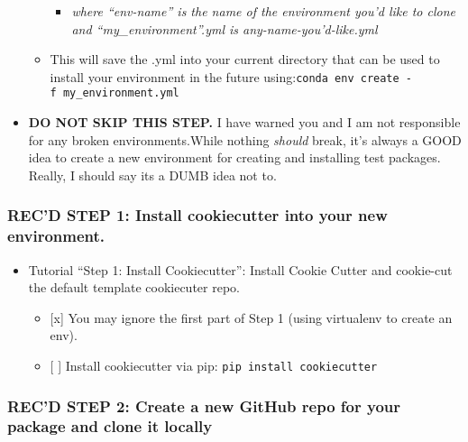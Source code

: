 \documentclass[11pt]{article}
\providecommand{\tightlist}{%
      \setlength{\itemsep}{0pt}\setlength{\parskip}{0pt}}
\begin{document}
\begin{itemize}
\begin{itemize}
    \begin{itemize}
    \tightlist
    \item
      \emph{where ``env-name'' is the name of the environment you'd like
      to clone and ``my\_environment''.yml is any-name-you'd-like.yml}
    \end{itemize}
  \item
    This will save the .yml into your current directory that can be used
    to install your environment in the future
    using:\texttt{conda\ env\ create\ -f\ my\_environment.yml}
  \end{itemize}
\item
  \textbf{DO NOT SKIP THIS STEP.} I have warned you and I am not
  responsible for any broken environments.While nothing \emph{should}
  break, it's always a GOOD idea to create a new environment for
  creating and installing test packages. Really, I should say its a DUMB
  idea not to. 
\end{itemize}

\hypertarget{recd-step-1-install-cookiecutter-into-your-new-environment.}{%
\subsubsection{REC'D STEP 1: Install cookiecutter into your new
environment.}\label{recd-step-1-install-cookiecutter-into-your-new-environment.}}

\begin{itemize}
\tightlist
\item
  Tutorial ``Step 1: Install Cookiecutter'': Install Cookie Cutter and
  cookie-cut the default template cookiecuter repo.

  \begin{itemize}
  \tightlist
  \item
    {[}x{]} You may ignore the first part of Step 1 (using virtualenv to
    create an env). 
  \item
    {[} {]} Install cookiecutter via pip:
    \texttt{pip\ install\ cookiecutter}
  \end{itemize}
\end{itemize}

\hypertarget{recd-step-2-create-a-new-github-repo-for-your-package-and-clone-it-locally}{%
\subsubsection{REC'D STEP 2: Create a new GitHub repo for your package
and clone it
locally}\label{recd-step-2-create-a-new-github-repo-for-your-package-and-clone-it-locally}}
\end{document}
